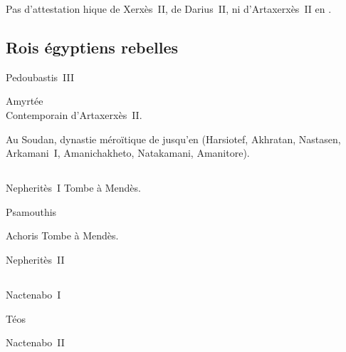 Pas d'attestation h\iero ique de Xerxès~II, de Darius~II, ni 
d'Artaxerxès~II en \kmt.

\subsection{Rois égyptiens rebelles}

\begin{listerois}
  \item [Pedoubastis~III]
  \item [Amyrtée \datation{(\anorange{404}{398})}]  \\
        Contemporain d'Artaxerxès~II.
\end{listerois}

Au Soudan, dynastie méroïtique de  jusqu'en  
(Harsiotef, Akhratan, Nastasen, Arkamani~I\ier, Amanichakheto, 
Natakamani, Amanitore).

\subsection{\texorpdfstring{}{XXIXe dynastie}}

\begin{listerois}
  \item [Nepheritès~I\ier \datation{(\anorange{398}{392})}] 
        Tombe à Mendès.
  \item [Psamouthis]
  \item [Achoris \datation{(\anorange{391}{379})}] Tombe à Mendès.
  \item [Nepheritès~II]
\end{listerois}

\subsection{\texorpdfstring{}{XXXe dynastie}}


\begin{listerois}
  \item [Nactenabo~I\ier \datation{(\anorange{378}{360})}]
  \item [Téos \datation{(\anorange{361}{359})}]
  \item [Nactenabo~II \datation{(\anorange{359}{341})}]
\end{listerois}


